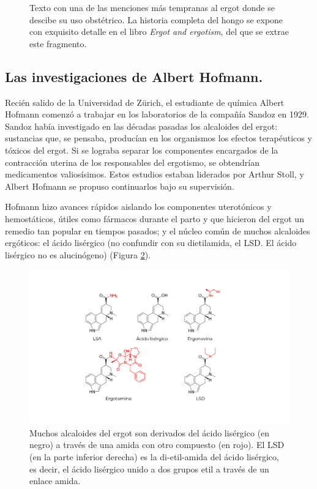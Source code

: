 \begin{figure}[H]
	\caption{Texto con una de las menciones más tempranas al ergot donde se descibe su uso obstétrico. La historia completa del hongo se expone con exquisito detalle en el libro \textit{Ergot and ergotism}, del que se extrae este fragmento.}
	\label{ergotbook}
\end{figure}

\subsection{Las investigaciones de Albert Hofmann.}

Recién salido de la Universidad de Zürich, el estudiante de química Albert Hofmann comenzó a trabajar en los laboratorios de la compañía Sandoz en 1929. Sandoz había investigado en las décadas pasadas los alcaloides del ergot: sustancias que, se pensaba, producían en los organismos los efectos terapéuticos y tóxicos del ergot. Si se lograba separar los componentes encargados de la contracción uterina de los responsables del ergotismo, se obtendrían medicamentos valiosísimos. Estos estudios estaban liderados por Arthur Stoll, y Albert Hofmann se propuso continuarlos bajo su supervisión.

Hofmann hizo avances rápidos aislando los componentes uterotónicos y hemostáticos, útiles como fármacos durante el parto y que hicieron del ergot un remedio tan popular en tiempos pasados; y el núcleo común de muchos alcaloides ergóticos: el ácido lisérgico (no confundir con su dietilamida, el LSD. El ácido lisérgico no es alucinógeno) (Figura \ref{alkaloids}).

\begin{figure}[H]
	\centering

	\includegraphics[width=\linewidth]{media/2-alkaloids.png}
	\caption{Muchos alcaloides del ergot son derivados del ácido lisérgico (en negro) a través de una amida con otro compuesto (en rojo). El LSD (en la parte inferior derecha) es la di-etil-amida del ácido lisérgico, es decir, el ácido lisérgico unido a dos grupos etil a través de un enlace amida.}
	\label{alkaloids}
\end{figure}

